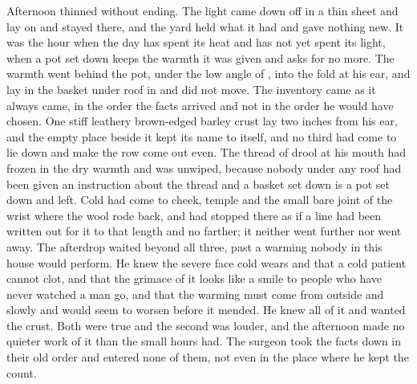 Afternoon thinned without ending. The light came down off  in a thin sheet and lay on  and stayed there, and the yard held what it had and gave nothing new. It was the hour when the day has spent its heat and has not yet spent its light, when a pot set down keeps the warmth it was given and asks for no more. The warmth went behind the pot, under the low angle of , into the fold at his ear, and  lay in the basket under  roof in  and did not move. The inventory came as it always came, in the order the facts arrived and not in the order he would have chosen. One stiff leathery brown-edged barley crust lay two inches from his ear, and the empty place beside it kept its name to itself, and no third had come to lie down and make the row come out even. The thread of drool at his mouth had frozen in the dry warmth and was unwiped, because nobody under any roof had been given an instruction about the thread and a basket set down is a pot set down and left. Cold had come to cheek, temple and the small bare joint of the wrist where the wool rode back, and had stopped there as if a line had been written out for it to that length and no farther; it neither went further nor went away. The afterdrop waited beyond all three, past a warming nobody in this house would perform. He knew the severe face cold wears and that a cold patient cannot clot, and that the grimace of it looks like a smile to people who have never watched a man go, and that the warming must come from outside and slowly and would seem to worsen before it mended. He knew all of it and wanted the crust. Both were true and the second was louder, and the afternoon made no quieter work of it than the small hours had. The surgeon took the facts down in their old order and entered none of them, not even in the place where he kept the count.

